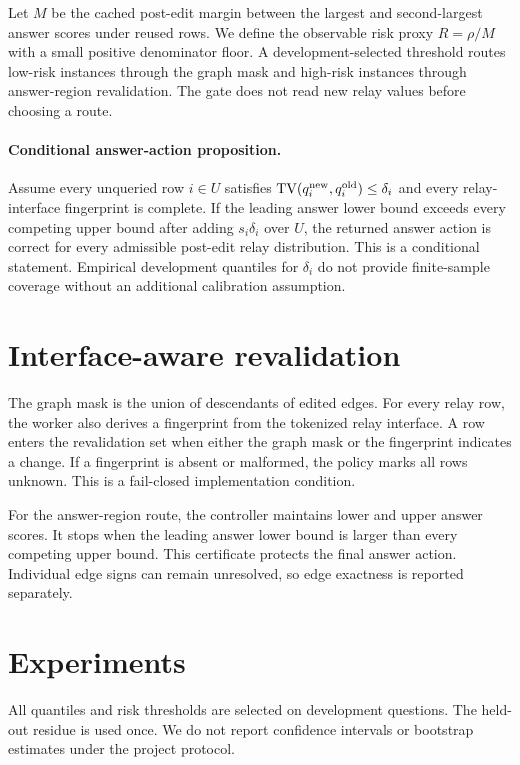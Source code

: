 \documentclass[11pt]{article}
\begin{document}
Let $M$ be the cached post-edit margin between the largest and second-largest answer scores under reused rows. We define the observable risk proxy $R=\rho/M$ with a small positive denominator floor. A development-selected threshold routes low-risk instances through the graph mask and high-risk instances through answer-region revalidation. The gate does not read new relay values before choosing a route.

\paragraph{Conditional answer-action proposition.}
Assume every unqueried row $i\in U$ satisfies $\operatorname{TV}(q_i^{\rm new},q_i^{\rm old})\leq\delta_i$ and every relay-interface fingerprint is complete. If the leading answer lower bound exceeds every competing upper bound after adding $s_i\delta_i$ over $U$, the returned answer action is correct for every admissible post-edit relay distribution. This is a conditional statement. Empirical development quantiles for $\delta_i$ do not provide finite-sample coverage without an additional calibration assumption.

\section{Interface-aware revalidation}
The graph mask is the union of descendants of edited edges. For every relay row, the worker also derives a fingerprint from the tokenized relay interface. A row enters the revalidation set when either the graph mask or the fingerprint indicates a change. If a fingerprint is absent or malformed, the policy marks all rows unknown. This is a fail-closed implementation condition.

For the answer-region route, the controller maintains lower and upper answer scores. It stops when the leading answer lower bound is larger than every competing upper bound. This certificate protects the final answer action. Individual edge signs can remain unresolved, so edge exactness is reported separately.

\section{Experiments}
All quantiles and risk thresholds are selected on development questions. The held-out residue is used once. We do not report confidence intervals or bootstrap estimates under the project protocol.
\end{document}
